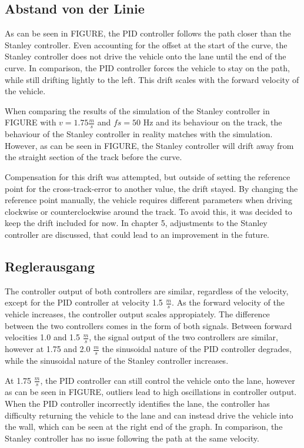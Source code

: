 \documentclass[arbeit=studie,oneside,BCOR=12mm]{ArbeitRST}
\begin{document}
\subsection{Abstand von der Linie}

As can be seen in FIGURE, the PID controller follows the path closer than the
Stanley controller. Even accounting for the offset at the start of the curve,
the Stanley controller does not drive the vehicle onto the lane until the end
of the curve. In comparison, the PID controller forces the vehicle to stay on
the path, while still drifting lightly to the left. This drift scales with the
forward velocity of the vehicle.

When comparing the results of the simulation of the Stanley controller in
FIGURE with $v = 1.75 \frac{m}{s}$ and $fs = 50$ Hz and its behaviour on the
track, the behaviour of the Stanley controller in reality matches with the
simulation. However, as can be seen in FIGURE, the Stanley controller will
drift away from the straight section of the track before the curve. 

Compensation for this drift was attempted, but outside of setting the reference
point for the cross-track-error to another value, the drift stayed. By changing
the reference point manually, the vehicle requires different parameters when
driving clockwise or counterclockwise around the track. To avoid this, it was
decided to keep the drift included for now. In chapter 5, adjustments to the
Stanley controller are discussed, that could lead to an improvement in the
future.


\subsection{Reglerausgang}

The controller output of both controllers are similar, regardless of the
velocity, except for the PID controller at velocity 1.5 $\frac{m}{s}$. As the
forward velocity of the vehicle increases, the controller output scales
appropiately. The difference between the two controllers comes in the form of
both signals. Between forward velocities 1.0 and 1.5 $\frac{m}{s}$, the signal
output of the two controllers are similar, however at 1.75 and 2.0
$\frac{m}{s}$ the sinusoidal nature of the PID controller degrades, while the
sinusoidal nature of the Stanley controller increases. 

At 1.75 $\frac{m}{s}$, the PID controller can still control the vehicle onto the 
lane, however as can be seen in FIGURE, outliers lead to high oscillations in controller output.
When the PID controller incorrectly identifies the lane, the controller has difficulty 
returning the vehicle to the lane and can instead drive the vehicle into the wall, which can be seen
at the right end of the graph. In comparison, the Stanley controller has no issue following the path
at the same velocity. 
\end{document}
